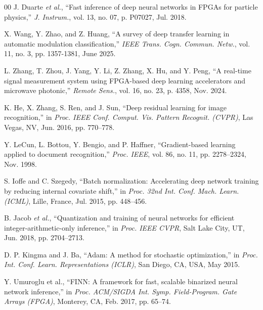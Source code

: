 \documentclass[conference]{IEEEtran}
\begin{document}
\begin{thebibliography}{00}
 J. Duarte \emph{et al.}, ``Fast inference of deep neural networks in FPGAs for particle physics,'' \emph{J. Instrum.}, vol. 13, no. 07, p. P07027, Jul. 2018.

 X. Wang, Y. Zhao, and Z. Huang, ``A survey of deep transfer learning in automatic modulation classification,'' \emph{IEEE Trans. Cogn. Commun. Netw.}, vol. 11, no. 3, pp. 1357-1381, June 2025.

 L. Zhang, T. Zhou, J. Yang, Y. Li, Z. Zhang, X. Hu, and Y. Peng, ``A real-time signal measurement system using FPGA-based deep learning accelerators and microwave photonic,'' \emph{Remote Sens.}, vol. 16, no. 23, p. 4358, Nov. 2024.

 K. He, X. Zhang, S. Ren, and J. Sun, ``Deep residual learning for image recognition,'' in \emph{Proc. IEEE Conf. Comput. Vis. Pattern Recognit. (CVPR)}, Las Vegas, NV, Jun. 2016, pp. 770--778.

 Y. LeCun, L. Bottou, Y. Bengio, and P. Haffner, ``Gradient-based learning applied to document recognition,'' \emph{Proc. IEEE}, vol. 86, no. 11, pp. 2278--2324, Nov. 1998.

 S. Ioffe and C. Szegedy, ``Batch normalization: Accelerating deep network training by reducing internal covariate shift,'' in \emph{Proc. 32nd Int. Conf. Mach. Learn. (ICML)}, Lille, France, Jul. 2015, pp. 448--456.

 B. Jacob \emph{et al.}, ``Quantization and training of neural networks for efficient integer-arithmetic-only inference,'' in \emph{Proc. IEEE CVPR}, Salt Lake City, UT, Jun. 2018, pp. 2704--2713.

 D. P. Kingma and J. Ba, ``Adam: A method for stochastic optimization,'' in \emph{Proc. Int. Conf. Learn. Representations (ICLR)}, San Diego, CA, USA, May 2015.

 Y. Umuroglu et al., ``FINN: A framework for fast, scalable binarized neural network inference,'' in \emph{Proc. ACM/SIGDA Int. Symp. Field-Program. Gate Arrays (FPGA)}, Monterey, CA, Feb. 2017, pp. 65--74.

\end{thebibliography}
\end{document}
